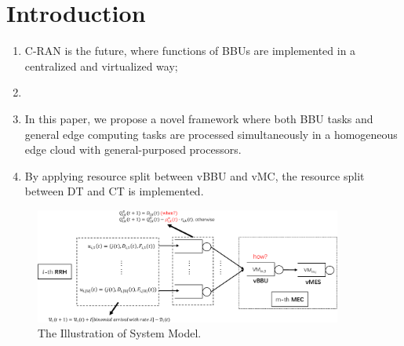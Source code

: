\section{Introduction}
\label{sec:intro}

\begin{enumerate}
	\item C-RAN is the future, where functions of BBUs are implemented in a centralized and virtualized way;
	\item {}
	\item In this paper, we propose a novel framework where both BBU tasks and general edge computing tasks are processed simultaneously in a homogeneous edge cloud with general-purposed processors.
	\item By applying resource split between vBBU and vMC, the resource split between DT and CT is implemented.  
\end{enumerate}

\begin{figure}[htb!]
	\centering
	\includegraphics[width=0.9\textwidth]{images/cran-system-model.pdf}
	\caption{The Illustration of System Model.}
	\label{fig:scenario}
\end{figure}